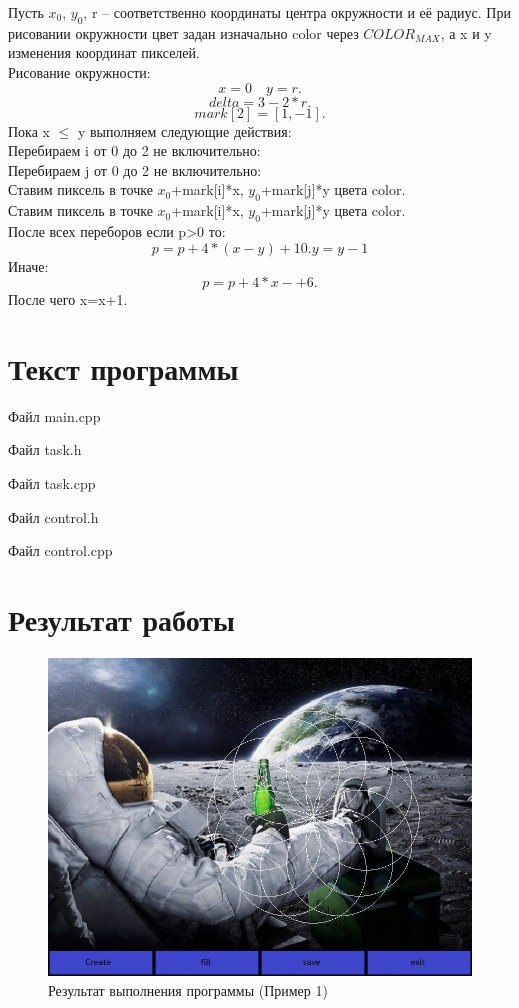 \documentclass[14pt, a4paper]{extreport}
\begin{document}
Пусть $x_0$, $y_0$, r -- соответственно координаты центра окружности и её радиус.
При рисовании окружности цвет задан изначально color через $COLOR_{MAX}$, а x и y изменения координат пикселей.\\
Рисование окружности:
$$ x = 0 \quad y = r . $$
$$ delta = 3-2*r . $$
$$ mark[2] = [1, -1] . $$
Пока x $\leq$ y выполняем следующие действия:\\
Перебираем i от 0 до 2 не включительно:\\
Перебираем j от 0 до 2 не включительно:\\
Ставим пиксель в точке $x_0$+mark[i]*x, $y_0$+mark[j]*y цвета color.\\
Ставим пиксель в точке $x_0$+mark[i]*x, $y_0$+mark[j]*y цвета color.\\
После всех переборов если p>0 то:
$$ p=p+4*(x-y)+10.  y=y-1$$
Иначе:
$$ p=p+4*x-+6. $$
После чего x=x+1.

\chapter{Текст программы}

\noindent Файл main.cpp

\pagebreak
\hrulefill

\noindent Файл task.h

\hrulefill

\noindent Файл task.cpp

\hrulefill

\noindent Файл control.h

\hrulefill

\noindent Файл control.cpp


\chapter{Результат работы}

\begin{figure}[h!]
	\centering
	\includegraphics[width = 12cm]{image/output1}
  \caption{Результат выполнения программы (Пример 1)}
\end{figure}
\end{document}
